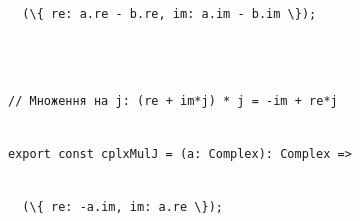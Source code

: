 \documentclass[
]{article}
\newcommand{\passthrough}[1]{#1}
\begin{document}
\passthrough{\lstinline!  !}\passthrough{\lstinline!(\{!}\passthrough{\lstinline! !}\passthrough{\lstinline!re!}\passthrough{\lstinline!:!}\passthrough{\lstinline! !}\passthrough{\lstinline!a!}\passthrough{\lstinline!.!}\passthrough{\lstinline!re!}\passthrough{\lstinline! !}\passthrough{\lstinline!-!}\passthrough{\lstinline! !}\passthrough{\lstinline!b!}\passthrough{\lstinline!.!}\passthrough{\lstinline!re!}\passthrough{\lstinline!,!}\passthrough{\lstinline! !}\passthrough{\lstinline!im!}\passthrough{\lstinline!:!}\passthrough{\lstinline! !}\passthrough{\lstinline!a!}\passthrough{\lstinline!.!}\passthrough{\lstinline!im!}\passthrough{\lstinline! !}\passthrough{\lstinline!-!}\passthrough{\lstinline! !}\passthrough{\lstinline!b!}\passthrough{\lstinline!.!}\passthrough{\lstinline!im!}\passthrough{\lstinline! !}\passthrough{\lstinline!\});!}\strut \\
\strut \\
\passthrough{\lstinline!//!}\passthrough{\lstinline! !}\passthrough{\lstinline!Множення!}\passthrough{\lstinline! !}\passthrough{\lstinline!на!}\passthrough{\lstinline! !}\passthrough{\lstinline!j!}\passthrough{\lstinline!:!}\passthrough{\lstinline! !}\passthrough{\lstinline!(!}\passthrough{\lstinline!re!}\passthrough{\lstinline! !}\passthrough{\lstinline!+!}\passthrough{\lstinline! !}\passthrough{\lstinline!im!}\passthrough{\lstinline!*!}\passthrough{\lstinline!j!}\passthrough{\lstinline!)!}\passthrough{\lstinline! !}\passthrough{\lstinline!*!}\passthrough{\lstinline! !}\passthrough{\lstinline!j!}\passthrough{\lstinline! !}\passthrough{\lstinline!=!}\passthrough{\lstinline! !}\passthrough{\lstinline!-!}\passthrough{\lstinline!im!}\passthrough{\lstinline! !}\passthrough{\lstinline!+!}\passthrough{\lstinline! !}\passthrough{\lstinline!re!}\passthrough{\lstinline!*!}\passthrough{\lstinline!j!}\strut \\
\passthrough{\lstinline!export!}\passthrough{\lstinline! !}\passthrough{\lstinline!const!}\passthrough{\lstinline! !}\passthrough{\lstinline!cplxMulJ!}\passthrough{\lstinline! !}\passthrough{\lstinline!=!}\passthrough{\lstinline! !}\passthrough{\lstinline!(!}\passthrough{\lstinline!a!}\passthrough{\lstinline!:!}\passthrough{\lstinline! !}\passthrough{\lstinline!Complex!}\passthrough{\lstinline!):!}\passthrough{\lstinline! !}\passthrough{\lstinline!Complex!}\passthrough{\lstinline! !}\passthrough{\lstinline!=>!}\strut \\
\passthrough{\lstinline!  !}\passthrough{\lstinline!(\{!}\passthrough{\lstinline! !}\passthrough{\lstinline!re!}\passthrough{\lstinline!:!}\passthrough{\lstinline! !}\passthrough{\lstinline!-!}\passthrough{\lstinline!a!}\passthrough{\lstinline!.!}\passthrough{\lstinline!im!}\passthrough{\lstinline!,!}\passthrough{\lstinline! !}\passthrough{\lstinline!im!}\passthrough{\lstinline!:!}\passthrough{\lstinline! !}\passthrough{\lstinline!a!}\passthrough{\lstinline!.!}\passthrough{\lstinline!re!}\passthrough{\lstinline! !}\passthrough{\lstinline!\});!}\strut \\
\end{document}
